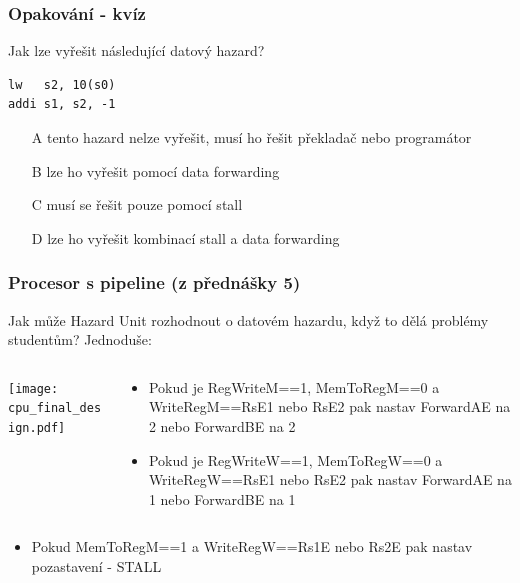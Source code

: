 \documentclass{beamer}
\begin{document}
\begin{frame}[fragile]
\frametitle{Opakování - kvíz}

Jak lze vyřešit následující datový hazard?

\begin{verbatim}
lw   s2, 10(s0)
addi s1, s2, -1 
\end{verbatim}
\bigskip
\begin{itemize}
 \item[A] tento hazard nelze vyřešit, musí ho řešit překladač nebo programátor
 \item[B] lze ho vyřešit pomocí data forwarding
 \item[C] musí se řešit pouze pomocí stall
 \item[D] lze ho vyřešit kombinací stall a data forwarding
\end{itemize}

\end{frame}


\begin{frame}

\frametitle{Procesor s pipeline (z přednášky 5)}

Jak může Hazard Unit rozhodnout o datovém hazardu, když to dělá problémy studentům? Jednoduše:
\begin{columns}
\begin{column}{0.67\textwidth}
\texttt{[image: cpu\_final\_design.pdf]}
\end{column}
\begin{column}{0.33\textwidth}
\footnotesize
\begin{itemize}
\item Pokud je RegWriteM==1, MemToRegM==0 a WriteRegM==RsE1 nebo RsE2 pak nastav ForwardAE na 2 nebo ForwardBE na 2
\item Pokud je RegWriteW==1, MemToRegW==0 a WriteRegW==RsE1 nebo RsE2 pak nastav ForwardAE na 1 nebo ForwardBE na 1
\end{itemize}
\end{column}
\end{columns}
\bigskip
\footnotesize
\begin{itemize}
\item Pokud MemToRegM==1 a WriteRegW==Rs1E nebo Rs2E pak nastav pozastavení - STALL
\end{itemize}
\end{frame}
\end{document}
